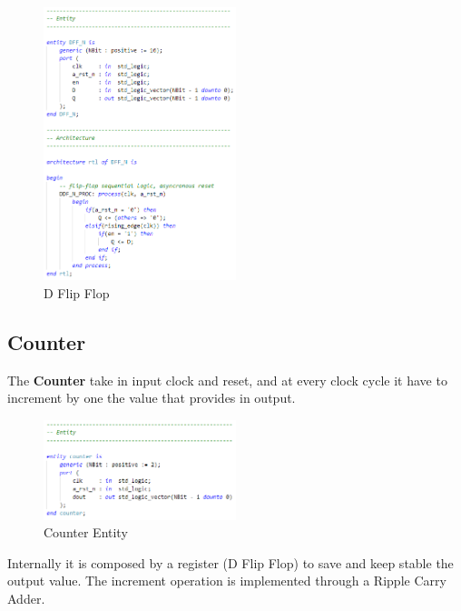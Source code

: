 \begin{figure}[H]
    \centering
    \includegraphics[width=0.5\textwidth]{img/Chapter3/DFF.png}
    \caption{D Flip Flop}
    \label{fig:DFF}
\end{figure}

\subsection{Counter}

The \textbf{Counter} take in input clock and reset, and at every clock cycle it have to increment by one the value that provides in output.

\begin{figure}[H]
    \centering
    \includegraphics[width=0.5\textwidth]{img/Chapter3/Counter-entity.png}
    \caption{Counter Entity}
    \label{fig:CE}
\end{figure}

Internally it is composed by a register (D Flip Flop) to save and keep stable the output value. The increment operation is implemented through a Ripple Carry Adder. 

